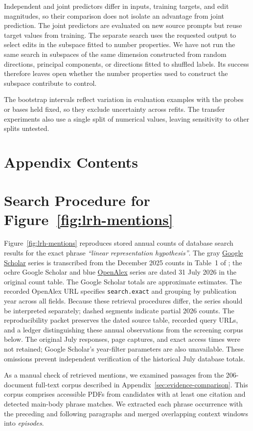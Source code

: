 \documentclass[11pt]{article}
\makeatletter
\newcommand{\appendixcontents}{%
  \section*{Appendix Contents}%
  \begingroup
  \small
  \@starttoc{atc}%
  \endgroup
}
\newcommand{\appendixsection}[1]{%
  \section{#1}%
  \addcontentsline{atc}{section}{\protect\numberline{\thesection}#1}%
}
\makeatother
\begin{document}
Independent and joint predictors differ in inputs, training targets, and edit magnitudes, so their comparison does not isolate an advantage from joint prediction.
The joint predictors are evaluated on new source prompts but reuse target values from training.
The separate search uses the requested output to select edits in the subspace fitted to number properties.
We have not run the same search in subspaces of the same dimension constructed from random directions, principal components, or directions fitted to shuffled labels.
Its success therefore leaves open whether the number properties used to construct the subspace contribute to control.

The bootstrap intervals reflect variation in evaluation examples with the probes or bases held fixed, so they exclude uncertainty across refits.
The transfer experiments also use a single split of numerical values, leaving sensitivity to other splits untested.



\clearpage
\appendix
\raggedbottom
\appendixcontents

\renewcommand{\dbltopfraction}{.95}
\renewcommand{\textfraction}{.02}

\appendixsection{Search Procedure for Figure~\ref{fig:lrh-mentions}}
\label{sec:lrh-search}

Figure~\ref{fig:lrh-mentions} reproduces stored annual counts of database search results for the exact phrase \emph{``linear representation hypothesis''}.
The gray \href{https://scholar.google.com/}{Google Scholar} series is transcribed from the December 2025 counts in Table~1 of \citet{lee2026survey}; the ochre Google Scholar and blue \href{https://openalex.org/}{OpenAlex} series are dated 31 July 2026 in the original count table.
The Google Scholar totals are approximate estimates.
The recorded OpenAlex URL specifies \texttt{search.exact} and grouping by publication year across all fields.
Because these retrieval procedures differ, the series should be interpreted separately; dashed segments indicate partial 2026 counts.
The reproducibility packet preserves the dated source table, recorded query URLs, and a ledger distinguishing these annual observations from the screening corpus below.
The original July responses, page captures, and exact access times were not retained; Google Scholar's year-filter parameters are also unavailable.
These omissions prevent independent verification of the historical July database totals.

As a manual check of retrieved mentions, we examined passages from the 206-document full-text corpus described in Appendix~\ref{sec:evidence-comparison}.
This corpus comprises accessible PDFs from candidates with at least one citation and detected main-body phrase matches.
We extracted each phrase occurrence with the preceding and following paragraphs and merged overlapping context windows into \emph{episodes}.
\end{document}
